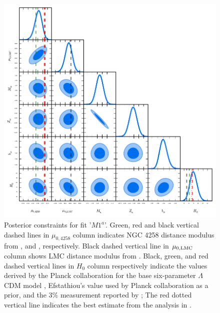 \begin{figure}[hbtp]
\centering
\includegraphics[scale=1]{figures/chapter-h0/triangle_plot.pdf}
\caption{Posterior constraints for fit '$M1^{a}$'. Green, red and black vertical dashed lines in $\mu_{0,4258}$ column indicates NGC 4258 distance modulus from \cite{Polshaw:2015ika}, \cite{Riess:2016jrr} and \cite{Humphreys:2013eja}, respectively. Black dashed vertical line in $\mu_{0,\mathrm{LMC}}$ column shows LMC distance modulus from \cite{Pietrzynski:2013gia}. Black, green, and red dashed vertical lines in $H_0$ column respectively indicate the values derived by the Planck collaboration for the base six-parameter $\Lambda$CDM model \cite{Ade:2015xua}, Efstathiou's value \cite{Efstathiou:2013via} used by Planck collaboration as a prior, and the $3\%$ measurement reported by \cite{Riess:2011yx}; The red dotted vertical line indicates the best estimate from the analysis in \cite{Riess:2016jrr}.   }
\label{Fig:Main-analysis-fitM1a}
\end{figure}

